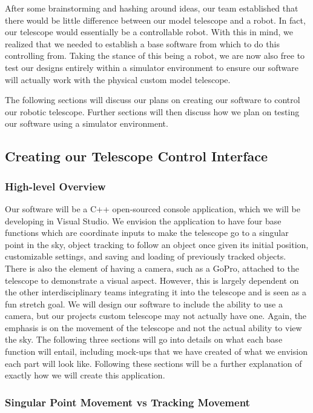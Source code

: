 \documentclass[12pt]{article}
\begin{document}
After some brainstorming and hashing around ideas, our team established that there would be little difference between our model telescope and a robot. In fact, our telescope would essentially be a controllable robot. With this in mind, we realized that we needed to establish a base software from which to do this controlling from. Taking the stance of this being a robot, we are now also free to test our designs entirely within a simulator environment to ensure our software will actually work with the physical custom model telescope.

The following sections will discuss our plans on creating our software to control our robotic telescope. Further sections will then discuss how we plan on testing our software using a simulator environment.

\subsection{Creating our Telescope Control Interface}

\subsubsection{High-level Overview}

Our software will be a C++ open-sourced console application, which we will be developing in Visual Studio. We envision the application to have four base functions which are coordinate inputs to make the telescope go to a singular point in the sky, object tracking to follow an object once given its initial position, customizable settings, and saving and loading of previously tracked objects. There is also the element of having a camera, such as a GoPro, attached to the telescope to demonstrate a visual aspect. However, this is largely dependent on the other interdisciplinary teams integrating it into the telescope and is seen as a fun stretch goal. We will design our software to include the ability to use a camera, but our projects custom telescope may not actually have one. Again, the emphasis is on the movement of the telescope and not the actual ability to view the sky. The following three sections will go into details on what each base function will entail, including mock-ups that we have created of what we envision each part will look like. Following these sections will be a further explanation of exactly how we will create this application.

\subsubsection{Singular Point Movement vs Tracking Movement}
\end{document}
